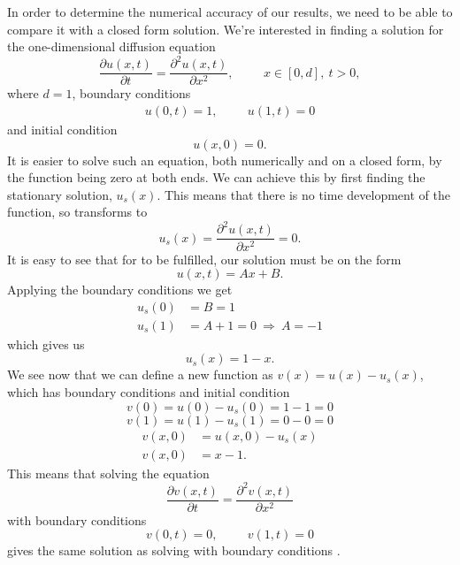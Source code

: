 
In order to determine the numerical accuracy of our results, we need to be able
to compare it with a closed form solution. We're interested in finding a
solution for the one-dimensional diffusion equation
%
\begin{equation}
	\frac{\partial u(x,t)}{\partial t} = \frac{\partial^2 u(x,t)}{\partial x^2},
	\hspace{1cm} x \in [0,d], \ t > 0,
	\label{eq:diffusioneq}
\end{equation}
%
where $d = 1$, boundary conditions 
%
\begin{align}
	u(0,t) = 1, \hspace{1cm} u(1,t) = 0
	\label{eq:bc}
\end{align}
%
and initial condition 
%
\begin{equation*}
	u(x,0) = 0.
\end{equation*}
%
It is easier to solve such an equation, both numerically and on a closed form,
by the function being zero at both ends. We can achieve this by first finding the
stationary solution, $u_s(x)$. This means that there is no time development of the
function, so  transforms to
%
\begin{equation}
	u_s(x) = \frac{\partial^2 u(x,t)}{\partial x^2} = 0.
	\label{eq:stationary}
\end{equation}
%
It is easy to see that for  to be fulfilled, our solution must
be on the form
%
\begin{equation*}
	u(x,t) = Ax + B.
\end{equation*}
%
Applying the boundary conditions  we get
%
\begin{align*}
	u_s(0) &= B = 1 \\
	u_s(1) &= A + 1 = 0 \ \Rightarrow \ A = -1
\end{align*}
%
which gives us
%
\begin{equation*}
	u_s(x) = 1 - x.
\end{equation*}
%
We see now that we can define a new function as $v(x) = u(x) - u_s(x)$, which
has boundary conditions and initial condition
%
\begin{equation}
	v(0) = u(0) - u_s(0) = 1 - 1 = 0
	\label{eq:bc0new}
\end{equation}
\begin{equation}
	v(1) = u(1) - u_s(1) = 0 - 0 = 0
	\label{eq:bc1new}
\end{equation}
\begin{align}
	v(x,0) &= u(x,0) - u_s(x) \nonumber \\
	v(x,0) &= x - 1. \label{eq:newInitial}
\end{align}
%
This means that solving the equation
%
\begin{equation*}
	\frac{\partial v(x,t)}{\partial t} = \frac{\partial^2 v(x,t)}{\partial x^2}
\end{equation*}
%
with boundary conditions
%
\begin{equation*}
	v(0,t) = 0, \hspace{1cm} v(1,t) = 0
\end{equation*}
%
gives the same solution as solving  with boundary conditions
.

